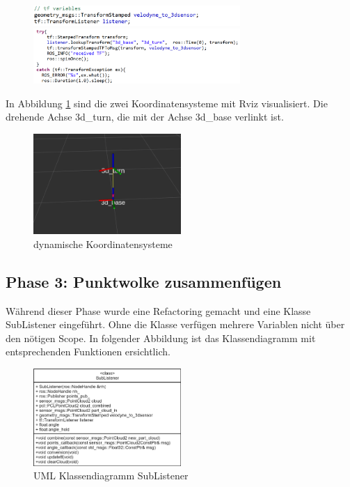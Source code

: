 \begin{figure}[H]
	\includegraphics[width=0.7\textwidth]{resources/sourcecode/tf_listener.png}
	\includegraphics[width=0.7\textwidth]{resources/sourcecode/tf_update.png}		

\end{figure}
In Abbildung \ref{fig:koordinaten} sind die zwei Koordinatensysteme mit Rviz visualisiert. Die drehende Achse 3d\_turn, die mit der Achse 3d\_base verlinkt ist.
\begin{figure}[H]
	\centering
	\includegraphics[width=0.5\textwidth]{resources/tf_rotation.PNG}
	\caption[dynamische Koordinatentransformation]{dynamische Koordinatensysteme}
	\label{fig:koordinaten}
\end{figure} 

\subsection{Phase 3: Punktwolke zusammenfügen}
\label{subsec:Phase3}
Während dieser Phase wurde eine \ac{Refactoring} gemacht und eine Klasse SubListener eingeführt. Ohne die Klasse verfügen mehrere Variablen nicht über den nötigen \ac{Scope}. In folgender Abbildung ist das Klassendiagramm mit entsprechenden Funktionen ersichtlich.

\begin{figure}[H]
	\centering
	\includegraphics[width=0.5\textwidth]{resources/classdiagram.PNG}
	\caption[UML Klassendiagramm SuListener]{UML Klassendiagramm SubListener}
	\label{fig:classSubListener}
\end{figure} 

